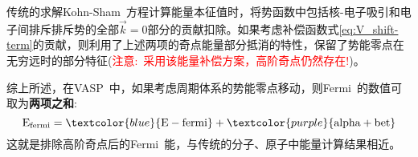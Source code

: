传统的求解\textrm{Kohn-Sham~}方程计算能量本征值时，将势函数中包括核-电子吸引和电子间排斥排斥势的全部$\vec k=0$部分的贡献扣除。如果考虑补偿函数式\eqref{eq:V_shift-term}的贡献，则利用了上述两项的奇点能量部分抵消的特性，保留了势能零点在无穷远时的部分特征(\textcolor{red}{注意:~采用该能量补偿方案，高阶奇点仍然存在!})。

综上所述，在\textrm{VASP~}中，如果考虑周期体系的势能零点移动，则\textrm{Fermi~}的数值可取为\textbf{两项之和}:~
\begin{displaymath}
	\mathrm{E_{fermi}}=\textcolor{blue}{\mathrm{E-fermi}}+\textcolor{purple}{\mathrm{alpha+bet}}
\end{displaymath}
这就是排除高阶奇点后的\textrm{Fermi~}能，与传统的分子、原子中能量计算结果相近。

